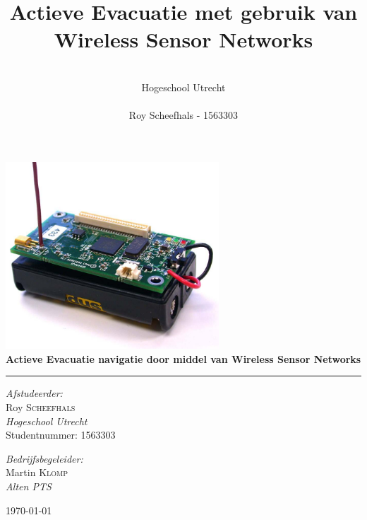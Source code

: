 \documentclass{../local}
\title{\textbf{Actieve Evacuatie met gebruik van Wireless Sensor Networks}}
\author{\\
		Hogeschool Utrecht\\
		\\
		Roy Scheefhals - 1563303}
\begin{document}
\begin{titlepage}
\begin{center}

\includegraphics[width=0.6\textwidth]{mica2}~\\[1cm]

{ \huge \bfseries Actieve Evacuatie navigatie door middel van Wireless Sensor Networks \\[0.4cm] }
\hrule
\hspace{0pt} 
\vspace{\fill}

\begin{minipage}{0.4\textwidth}
\begin{flushleft} \large
\emph{Afstudeerder:}\\
Roy \textsc{Scheefhals}\\
\emph{Hogeschool Utrecht}\\
Studentnummer: 1563303\\
\end{flushleft}
\end{minipage}
\begin{minipage}{0.4\textwidth}
\begin{flushright} \large
\emph{Bedrijfsbegeleider:} \\
Martin \textsc{Klomp}\\
\emph{Alten PTS}
\end{flushright}
\end{minipage}

\end{center}
\today
\end{titlepage}

\renewcommand{\thesection}{\Roman{section}}


%
\end{document}
